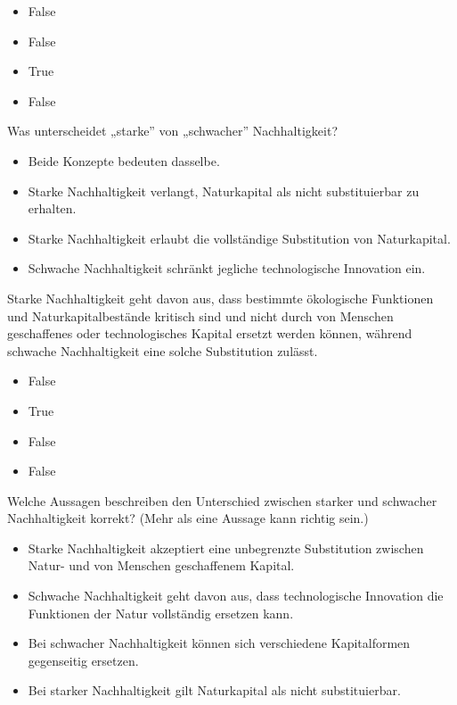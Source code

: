 \documentclass[
  nswissgerman,
  a4paper,
  DIV=11,
  numbers=noendperiod,
  oneside,
  openany]{scrreprt}
\providecommand{\tightlist}{%
  \setlength{\itemsep}{0pt}\setlength{\parskip}{0pt}}
\begin{document}
\begin{itemize}
\tightlist
\item
  False
\item
  False
\item
  True
\item
  False
\end{itemize}

Was unterscheidet „starke'' von „schwacher'' Nachhaltigkeit?

\begin{itemize}
\tightlist
\item[$\square$]
  Beide Konzepte bedeuten dasselbe.
\item[$\square$]
  Starke Nachhaltigkeit verlangt, Naturkapital als nicht substituierbar
  zu erhalten.
\item[$\square$]
  Starke Nachhaltigkeit erlaubt die vollständige Substitution von
  Naturkapital.
\item[$\square$]
  Schwache Nachhaltigkeit schränkt jegliche technologische Innovation
  ein.
\end{itemize}

Starke Nachhaltigkeit geht davon aus, dass bestimmte ökologische
Funktionen und Naturkapitalbestände kritisch sind und nicht durch von
Menschen geschaffenes oder technologisches Kapital ersetzt werden
können, während schwache Nachhaltigkeit eine solche Substitution
zulässt.

\begin{itemize}
\tightlist
\item
  False
\item
  True
\item
  False
\item
  False
\end{itemize}

Welche Aussagen beschreiben den Unterschied zwischen starker und
schwacher Nachhaltigkeit korrekt? (Mehr als eine Aussage kann richtig
sein.)

\begin{itemize}
\tightlist
\item[$\square$]
  Starke Nachhaltigkeit akzeptiert eine unbegrenzte Substitution
  zwischen Natur- und von Menschen geschaffenem Kapital.
\item[$\square$]
  Schwache Nachhaltigkeit geht davon aus, dass technologische Innovation
  die Funktionen der Natur vollständig ersetzen kann.
\item[$\square$]
  Bei schwacher Nachhaltigkeit können sich verschiedene Kapitalformen
  gegenseitig ersetzen.
\item[$\square$]
  Bei starker Nachhaltigkeit gilt Naturkapital als nicht substituierbar.
\end{itemize}
\end{document}
